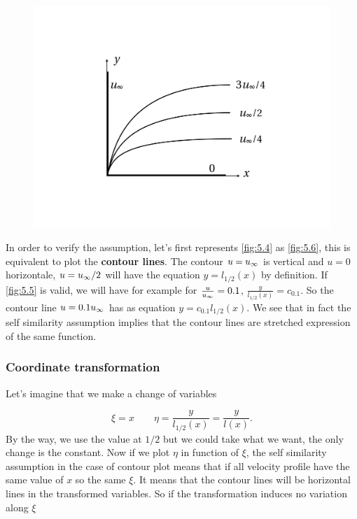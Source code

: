 	\begin{figure}
	\vspace{-5mm}
	\includegraphics[scale=0.23]{ch5/6}
	\label{fig:5.6}
	\end{figure}
	In order to verify the assumption, let's first represents \autoref{fig:5.4} as \autoref{fig:5.6}, this is equivalent to plot the \textbf{contour lines}. The contour $u=\uinf$ is vertical and $u=0$ horizontale, $u=\uinf /2$ will have the equation $y = l_{1/2}(x)$ by definition. If \autoref{fig:5.5} is valid, we will have for example for $\frac{u}{\uinf} = 0.1$, $\frac{y}{l_{1/2}(x)} = c_{0.1}$. So the contour line $u = 0.1 \uinf$ has as equation $y = c_{0.1}l_{1/2}(x)$. We see that in fact the self similarity assumption implies that the contour lines are stretched expression of the same function. 
	
	\newpage
	
	\subsubsection{Coordinate transformation}
		Let's imagine that we make a change of variables 

		\begin{equation}
			\xi = x \qquad \eta = \frac{y}{l_{1/2}(x)} = \frac{y}{l(x)}.
			\label{eq:5.14}
		\end{equation}
		By the way, we use the value at $1/2$ but we could take what we want, the only change is the constant. Now if we plot $\eta$ in function of $\xi$, the self similarity assumption in the case of contour plot means that if all velocity profile have the same value of $x$ so the same $\xi$. It means that the contour lines will be horizontal lines in the transformed variables. So if the transformation induces no variation along $\xi$
		
